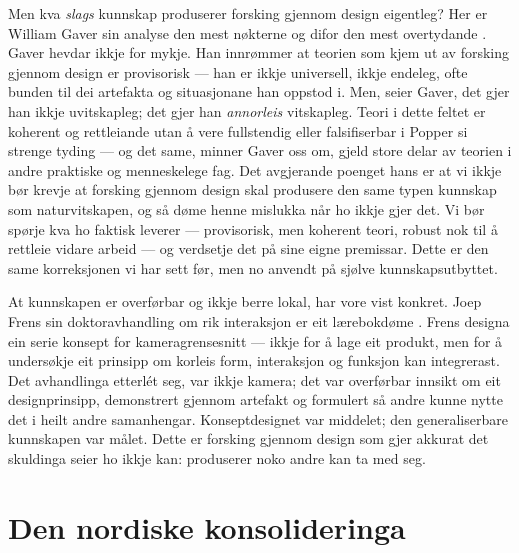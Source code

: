 Men kva \emph{slags} kunnskap produserer forsking gjennom design eigentleg? Her er William Gaver sin analyse den mest nøkterne og difor den mest overtydande \autocite{gaver2012what}. Gaver hevdar ikkje for mykje. Han innrømmer at teorien som kjem ut av forsking gjennom design er provisorisk — han er ikkje universell, ikkje endeleg, ofte bunden til dei artefakta og situasjonane han oppstod i. Men, seier Gaver, det gjer han ikkje uvitskapleg; det gjer han \emph{annorleis} vitskapleg. Teori i dette feltet er koherent og rettleiande utan å vere fullstendig eller falsifiserbar i Popper si strenge tyding — og det same, minner Gaver oss om, gjeld store delar av teorien i andre praktiske og menneskelege fag. Det avgjerande poenget hans er at vi ikkje bør krevje at forsking gjennom design skal produsere den same typen kunnskap som naturvitskapen, og så døme henne mislukka når ho ikkje gjer det. Vi bør spørje kva ho faktisk leverer — provisorisk, men koherent teori, robust nok til å rettleie vidare arbeid — og verdsetje det på sine eigne premissar. Dette er den same korreksjonen vi har sett før, men no anvendt på sjølve kunnskapsutbyttet.

At kunnskapen er overførbar og ikkje berre lokal, har vore vist konkret. Joep Frens sin doktoravhandling om rik interaksjon er eit lærebokdøme \autocite{frens2006rich}. Frens designa ein serie konsept for kameragrensesnitt — ikkje for å lage eit produkt, men for å undersøkje eit prinsipp om korleis form, interaksjon og funksjon kan integrerast. Det avhandlinga etterlét seg, var ikkje kamera; det var overførbar innsikt om eit designprinsipp, demonstrert gjennom artefakt og formulert så andre kunne nytte det i heilt andre samanhengar. Konseptdesignet var middelet; den generaliserbare kunnskapen var målet. Dette er forsking gjennom design som gjer akkurat det skuldinga seier ho ikkje kan: produserer noko andre kan ta med seg.

\section{Den nordiske konsolideringa}

